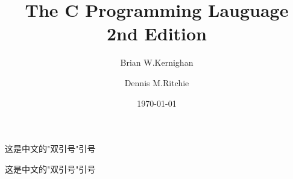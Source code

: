 \documentclass[nofonts, a4paper, oneside, 10pt]{book}
\title{The C Programming Lauguage \\ 2nd Edition}
\author{Brian W.Kernighan \and Dennis M.Ritchie}
\date{\today}
\numberwithin{exercnt}{chapter}
\newcommand\lquote{\phantom{ }"}
\newenvironment{myquotation}
    {\phantom{ }\CJKsetecglue{}"}
    {"}
\begin{document}
    这是中文的\lquote 双引号"引号

    这是中文的\begin{myquotation}双引号\end{myquotation}引号
\end{document}
